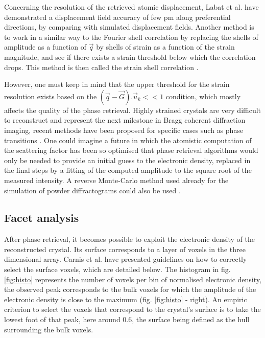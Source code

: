 Concerning the resolution of the retrieved atomic displacement, Labat et al. \parencite*{Labat2015} have demonstrated a displacement field accuracy of few \unit{pm} along preferential directions, by comparing with simulated displacement fields.
Another method is to work in a similar way to the Fourier shell correlation by replacing the shells of amplitude as a function of $\vec{q}$ by shells of strain as a function of the strain magnitude, and see if there exists a strain threshold below which the correlation drops.
This method is then called the strain shell correlation \parencite{Girard2020}.

However, one must keep in mind that the upper threshold for the strain resolution exists based on the $(\vec{q}-\vec{G}).\vec{u}_k<<1$ condition, which mostly affects the quality of the phase retrieval.
Highly strained crystals are very difficult to reconstruct and represent the next milestone in Bragg coherent diffraction imaging, recent methods have been proposed for specific cases such as phase transitions \parencite{Wang2020}.
One could imagine a future in which the atomistic computation of the scattering factor has been so optimised that phase retrieval algorithms would only be needed to provide an initial guess to the electronic density, replaced in the final steps by a fitting of the computed amplitude to the square root of the measured intensity.
A reverse Monte-Carlo method used already for the simulation of powder diffractograms could also be used \parencite{RLMcGreevy2001}.

\subsection{Facet analysis} \label{sec:FacetAnalysis}

After phase retrieval, it becomes possible to exploit the electronic density of the reconstructed crystal.
Its surface corresponds to a layer of voxels in the three dimensional array.
Carnis et al. \parencite*{Carnis2019} have presented guidelines on how to correctly select the surface voxels, which are detailed below.
The histogram in fig. \ref{fig:histo} represents the number of voxels per bin of normalised electronic density, the observed peak corresponds to the bulk voxels for which the amplitude of the electronic density is close to the maximum (fig. \ref{fig:histo} - right).
An empiric criterion to select the voxels that correspond to the crystal's surface is to take the lowest foot of that peak, here around \num{0.6}, the surface being defined as the hull surrounding the bulk voxels.

